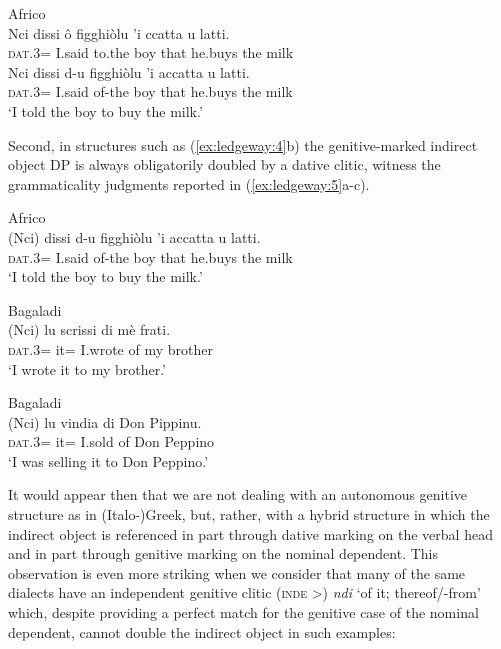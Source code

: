 \documentclass[output=paper,modfonts,nonflat,colorlinks,citecolor=brown]{langsci/langscibook}
\begin{document}
\ea\label{ex:ledgeway:4}
  Africo\\
\ea
	\gll Nci  dissi  ô  figghiòlu  ’i  ccatta  u  latti.\\
    \textsc{dat}.3=  I.said  to.the  boy  that  he.buys  the  milk\\

\ex
	\gll Nci  dissi  d-u  figghiòlu  ’i  accatta  u  latti.\\
    \textsc{dat}.3=  I.said  of-the  boy  that  he.buys  the  milk\\
    \glt `I told the boy to buy the milk.' 
    \z
    \z

Second, in structures such as (\ref{ex:ledgeway:4}b) the genitive-marked indirect object DP is always obligatorily doubled by a dative clitic, witness the grammaticality judgments reported in (\ref{ex:ledgeway:5}a-c). 

\ea\label{ex:ledgeway:5}
\ea Africo\\
\gll        *(Nci)  dissi  d-u  figghiòlu  ’i  accatta  u  latti.\\
      \textsc{dat}.3=  I.said  of-the  boy  that  he.buys  the  milk\\
      \glt `I told the boy to buy the milk.'

    \ex   Bagaladi\\
          \gll *(Nci)  lu  scrissi  di  mè  frati.\\
      \textsc{dat}.3=  it=  I.wrote  of  my  brother\\
      \glt `I wrote it to my brother.'
    
    \ex  Bagaladi\\
          \gll *(Nci)  lu  vindia  di  Don  Pippinu.\\
      \textsc{dat}.3=  it=  I.sold  of  Don  Peppino\\
      \glt `I was selling it to Don Peppino.'
\z
\z

It would appear then that we are not dealing with an autonomous genitive structure as in (Italo-)Greek, but, rather, with a hybrid structure in which the indirect object is referenced in part through dative marking on the verbal head and in part through genitive marking on the nominal dependent. This observation is even more striking when we consider that many of the same dialects have an independent genitive clitic (\textsc{inde} >) \textit{ndi} ‘of it; thereof/-from’ which, despite providing a perfect match for the genitive case of the nominal dependent, cannot double the indirect object in such examples:
\end{document}
